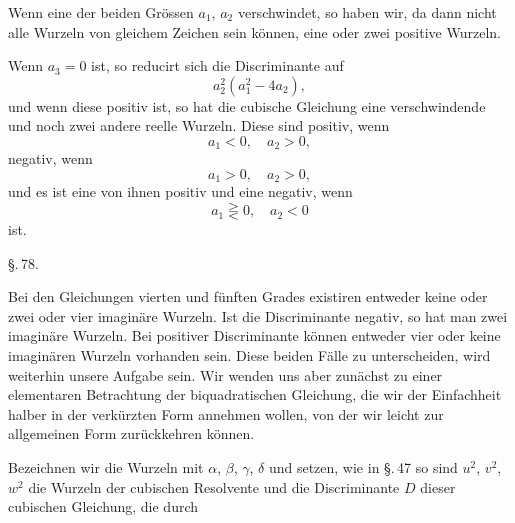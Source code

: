 
Wenn eine der beiden Grössen $a_1$, $a_2$ verschwindet, so haben wir, da dann nicht alle Wurzeln von gleichem Zeichen sein können, eine oder zwei positive Wurzeln.

Wenn $a_3 = 0$ ist, so reducirt sich die Discriminante auf
\[
a_2^2(a_1^2 - 4a_2),
\]
und wenn diese positiv ist, so hat die cubische Gleichung eine verschwindende und noch zwei andere reelle Wurzeln. Diese sind positiv, wenn
\[
a_1 < 0, \quad a_2 > 0,
\]
negativ, wenn
\[
a_1 > 0, \quad a_2 > 0,
\]
und es ist eine von ihnen positiv und eine negativ, wenn
\[
a_1 \gtreqless 0, \quad a_2 < 0
\]
ist.

\begin{center}
\S.\,78.

\end{center}

Bei den Gleichungen vierten und fünften Grades existiren entweder keine oder zwei oder vier imaginäre Wurzeln. Ist die Discriminante negativ, so hat man zwei imaginäre Wurzeln. Bei positiver Discriminante können entweder vier oder keine imaginären Wurzeln vorhanden sein. Diese beiden Fälle zu unterscheiden, wird weiterhin unsere Aufgabe sein. Wir wenden uns aber zunächst zu einer elementaren Betrachtung der biquadratischen Gleichung, die wir der Einfachheit halber in der verkürzten Form
annehmen wollen, von der wir leicht zur allgemeinen Form zurückkehren können.

Bezeichnen wir die Wurzeln mit $\alpha$, $\beta$, $\gamma$, $\delta$ und setzen, wie in \S.\,47
so sind $u^2$, $v^2$, $w^2$ die Wurzeln der cubischen Resolvente
und die Discriminante $D$ dieser cubischen Gleichung, die durch
